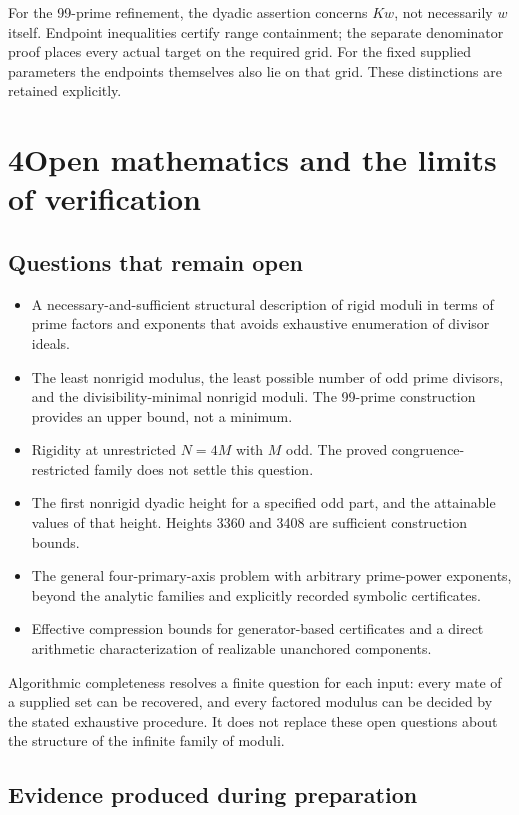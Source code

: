 \documentclass[10pt]{article}
\begin{document}
For the 99-prime refinement, the dyadic assertion concerns $Kw$, not necessarily $w$ itself. Endpoint inequalities certify range containment; the separate denominator proof places every actual target on the required grid. For the fixed supplied parameters the endpoints themselves also lie on that grid. These distinctions are retained explicitly.

\clearpage
\section*{4\quad Open mathematics and the limits of verification}

\subsection*{Questions that remain open}

\begin{itemize}
\item A necessary-and-sufficient structural description of rigid moduli in terms of prime factors and exponents that avoids exhaustive enumeration of divisor ideals.
\item The least nonrigid modulus, the least possible number of odd prime divisors, and the divisibility-minimal nonrigid moduli. The 99-prime construction provides an upper bound, not a minimum.
\item Rigidity at unrestricted $N=4M$ with $M$ odd. The proved congruence-restricted family does not settle this question.
\item The first nonrigid dyadic height for a specified odd part, and the attainable values of that height. Heights 3360 and 3408 are sufficient construction bounds.
\item The general four-primary-axis problem with arbitrary prime-power exponents, beyond the analytic families and explicitly recorded symbolic certificates.
\item Effective compression bounds for generator-based certificates and a direct arithmetic characterization of realizable unanchored components.
\end{itemize}

Algorithmic completeness resolves a finite question for each input: every mate of a supplied set can be recovered, and every factored modulus can be decided by the stated exhaustive procedure. It does not replace these open questions about the structure of the infinite family of moduli.

\subsection*{Evidence produced during preparation}
\end{document}
